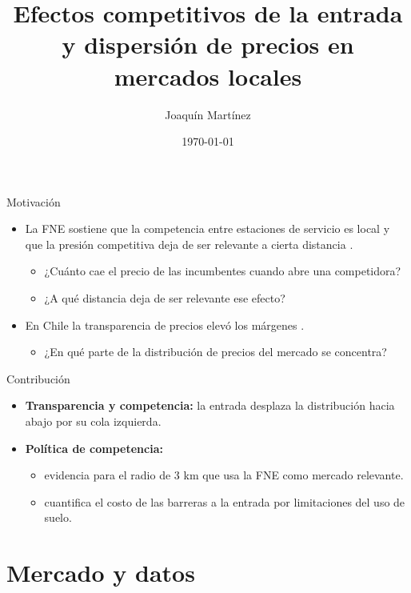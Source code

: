 \documentclass{beamer}
\title{Efectos competitivos de la entrada y dispersión de precios en mercados locales}
\author{Joaquín Martínez}
\institute{Universidad de Chile, Facultad de Economía y Negocios}
\date{\today}
\begin{document}
\frame{\titlepage}

\begin{frame}{Motivación}
  \begin{itemize}
    \item La FNE sostiene que la competencia entre estaciones de servicio es local y que la presión competitiva deja de ser relevante a cierta distancia \parencite{FNE2021informe}.
    \begin{itemize}
      \item ¿Cuánto cae el precio de las incumbentes cuando abre una competidora?
      \item ¿A qué distancia deja de ser relevante ese efecto?
    \end{itemize}
    \item En Chile la transparencia de precios elevó los márgenes \parencite{LUCO2019}.
    \begin{itemize}
      \item ¿En qué parte de la distribución de precios del mercado se concentra?
    \end{itemize}
  \end{itemize}
\end{frame}

\begin{frame}{Contribución}
  \begin{itemize}
    \item \textbf{Transparencia y competencia:} la entrada desplaza la distribución hacia abajo por su cola izquierda.
    \item \textbf{Política de competencia:}
      \begin{itemize}
        \item evidencia para el radio de 3 km que usa la FNE como mercado relevante.
        \item cuantifica el costo de las barreras a la entrada por limitaciones del uso de suelo.
      \end{itemize}
  \end{itemize}
\end{frame}

\section{Mercado y datos}
\end{document}
